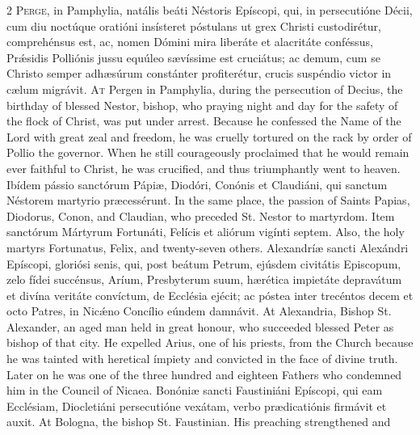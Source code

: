 \begin{paracol}{2}
\lettrine[lines=2]{P}{erge,} in Pamphylia, natális beáti Néstoris 
 Epíscopi, qui, in persecutióne Décii, cum diu noctúque oratióni insísteret 
 póstulans ut grex Christi custodirétur, comprehénsus est, ac, nomen Dómini 
 mira liberáte et alacritáte conféssus, Prǽsidis Polliónis jussu equúleo 
 sævíssime est cruciátus; ac demum, cum se Christo semper adhæsúrum 
 constánter profiterétur, crucis suspéndio victor in cælum migrávit.
\switchcolumn
{}
\lettrine[lines=2]{A}{t} Pergen in Pamphylia, during the persecution of Decius, the birthday of 
 blessed Nestor, bishop, who praying night and day for the safety of the 
 flock of Christ, was put under arrest. Because he confessed the Name 
 of the Lord with great zeal and freedom, he was cruelly tortured on the rack 
 by order of Pollio the governor. When he still courageously proclaimed 
 that he would remain ever faithful to Christ, he was crucified, and thus 
 triumphantly went to heaven.
\switchcolumn*
{}
Ibídem pássio sanctórum Pápiæ, Diodóri, Conónis 
 et Claudiáni, qui sanctum Néstorem martyrio præcessérunt.
\switchcolumn
{}
In the same place, the passion of Saints Papias, Diodorus, Conon, and 
 Claudian, who preceded St. Nestor to martyrdom.
\switchcolumn*
{}
Item sanctórum Mártyrum Fortunáti, Felícis et aliórum vigínti septem.
\switchcolumn
{}
Also, the holy martyrs Fortunatus, Felix, and twenty-seven others.
\switchcolumn*
{}
Alexandríæ sancti Alexándri Epíscopi, gloriósi 
 senis, qui, post beátum Petrum, ejúsdem civitátis Episcopum, zelo fídei 
 succénsus, Aríum, Presbyterum suum, hærética impietáte depravátum et divína 
 veritáte convíctum, de Ecclésia ejécit; ac póstea inter trecéntos decem et 
 octo Patres, in Nicǽno Concílio eúndem damnávit.
\switchcolumn
{}
At Alexandria, Bishop St. Alexander, an aged man held in great honour, who 
 succeeded blessed Peter as bishop of that city. He expelled Arius, one 
 of his priests, from the Church because he was tainted with heretical 
 ímpiety and convicted in the face of divine truth. Later on he was one 
 of the three hundred and eighteen Fathers who condemned him in the Council 
 of Nicaea.
\switchcolumn*
{}
Bonóniæ sancti Faustiniáni Epíscopi, qui eam 
 Ecclésiam, Diocletiáni persecutióne vexátam, verbo prædicatiónis firmávit et 
 auxit.
\switchcolumn
{}
At Bologna, the bishop St. Faustinian. His preaching strengthened and 

\end{paracol}

